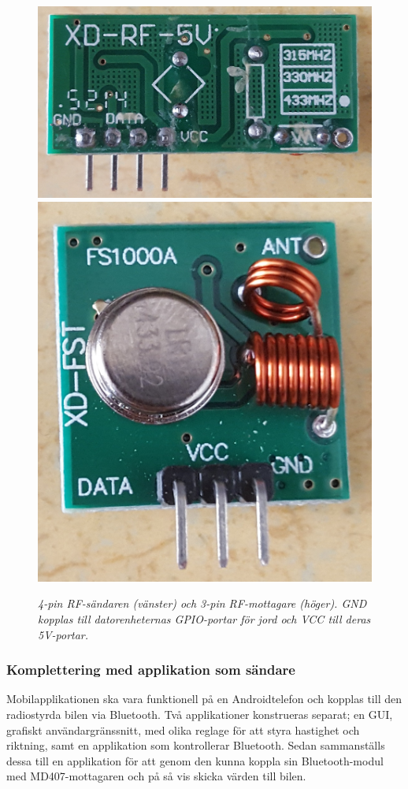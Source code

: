\documentclass[a4paper]{article}
\begin{document}
\begin{figure}[H]
\includegraphics[scale=0.06]{RF-transmitter.jpg}
\includegraphics[scale=0.05]{RF-receiver.jpg}
\centering
\caption{\it 4-pin RF-sändaren (vänster) och 3-pin RF-mottagare (höger). GND kopplas till datorenheternas GPIO-portar för jord och VCC till deras 5V-portar.}
\end{figure} 


\subsubsection{Komplettering med applikation som sändare}
Mobilapplikationen ska vara funktionell på en Androidtelefon och kopplas till den radiostyrda bilen via Bluetooth. Två applikationer konstrueras separat; en GUI, grafiskt användargränssnitt, med olika reglage för att styra hastighet och riktning, samt en applikation som kontrollerar Bluetooth. Sedan sammanställs dessa till en applikation för att genom den kunna koppla sin Bluetooth-modul med MD407-mottagaren och på så vis skicka värden till bilen.
\end{document}
